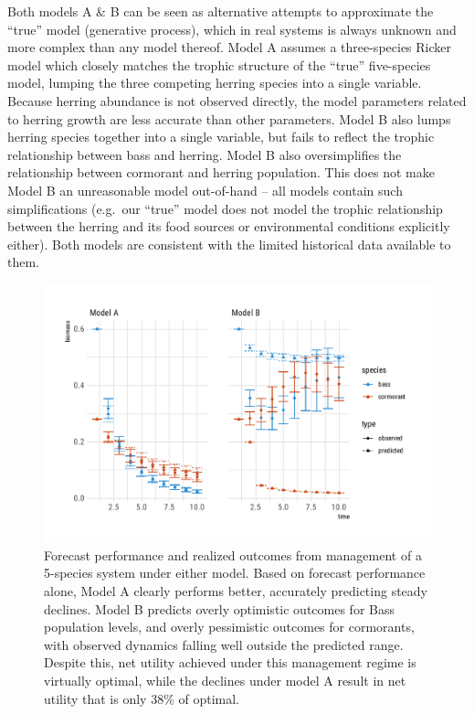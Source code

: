 \documentclass[3p]{elsarticle} %
\begin{document}
Both models A \& B can be seen as alternative attempts to approximate
the ``true'' model (generative process), which in real systems is always
unknown and more complex than any model thereof. Model A assumes a
three-species Ricker model which closely matches the trophic structure
of the ``true'' five-species model, lumping the three competing herring
species into a single variable. Because herring abundance is not
observed directly, the model parameters related to herring growth are
less accurate than other parameters. Model B also lumps herring species
together into a single variable, but fails to reflect the trophic
relationship between bass and herring. Model B also oversimplifies the
relationship between cormorant and herring population. This does not
make Model B an unreasonable model out-of-hand -- all models contain
such simplifications (e.g.~our ``true'' model does not model the trophic
relationship between the herring and its food sources or environmental
conditions explicitly either). Both models are consistent with the
limited historical data available to them.

\begin{figure}
\centering
\includegraphics{manuscript_files/figure-latex/example1-1.pdf}
\caption{Forecast performance and realized outcomes from management of a
5-species system under either model. Based on forecast performance
alone, Model A clearly performs better, accurately predicting steady
declines. Model B predicts overly optimistic outcomes for Bass
population levels, and overly pessimistic outcomes for cormorants, with
observed dynamics falling well outside the predicted range. Despite
this, net utility achieved under this management regime is virtually
optimal, while the declines under model A result in net utility that is
only 38\% of optimal.}
\end{figure}
\end{document}
